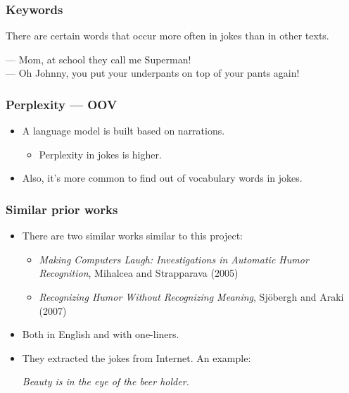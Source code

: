 \begin{frame}
    \frametitle{Keywords}

    There are certain words that occur more often in jokes than in other texts.

    \begin{example}
        --- Mom, at school they call me Superman! \\
        --- Oh Johnny, you put your underpants on top of your pants again!
    \end{example}
\end{frame}

\begin{frame}
    \frametitle{Perplexity --- OOV}

    \begin{itemize}
        \item A language model is built based on narrations.

        \begin{itemize}
            \item Perplexity in jokes is higher.
        \end{itemize}

        \item Also, it's more common to find out of vocabulary words in jokes.
    \end{itemize}
\end{frame}

\begin{frame}
    \frametitle{Similar prior works}

    \begin{itemize}
        \item There are two similar works similar to this project:

        \begin{itemize}
            \item \emph{Making Computers Laugh: Investigations in Automatic Humor Recognition}, Mihalcea and Strapparava (2005)
            \item \emph{Recognizing Humor Without Recognizing Meaning}, Sjöbergh and Araki (2007)
        \end{itemize}

        \item Both in English and with one-liners.

        \item They extracted the jokes from Internet. An example:

        \begin{center}
            \emph{Beauty is in the eye of the beer holder.}
        \end{center}
    \end{itemize}
\end{frame}

